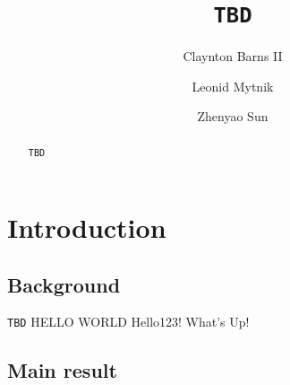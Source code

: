 \documentclass[12pt,a4paper]{amsart}
\numberwithin{equation}{section}
\theoremstyle{plain}
\theoremstyle{remark}
\begin{document}
	\title[]{{\tt TBD}}
	\author[]{Claynton Barns II}
	\address{{\tt TBD}}
	\author[]{Leonid Mytnik}
	\address{{\tt TBD}}
	\author[]{Zhenyao Sun}
	\address{{\tt TBD}}
\begin{abstract}
	{\tt TBD}
\end{abstract}
\maketitle
	
\section{Introduction}
\subsection{Background} 
    {\tt TBD}
    {HELLO WORLD}
    Hello123! What's Up!
   
\subsection{Main result} \label{sec:M} 
\end{document}
